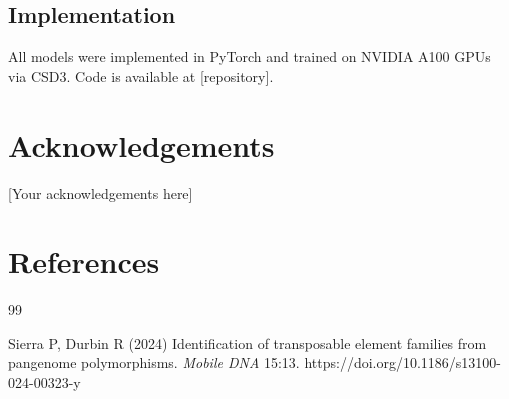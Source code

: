 \documentclass[12pt]{article}
\begin{document}
\subsection{Implementation}

All models were implemented in PyTorch and trained on NVIDIA A100 GPUs via CSD3. Code is available at [repository].

\newpage
\section*{Acknowledgements}

[Your acknowledgements here]

\newpage
\section*{References}

\begin{thebibliography}{99}

Sierra P, Durbin R (2024) Identification of transposable element families from pangenome polymorphisms. \textit{Mobile DNA} 15:13. https://doi.org/10.1186/s13100-024-00323-y

\end{thebibliography}
\end{document}
